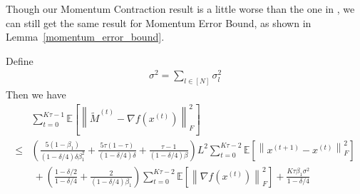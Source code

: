 Though our Momentum Contraction result is a little worse than the one in \cite{he2024subspace}, we can still get the same result for Momentum Error Bound, as shown in Lemma~\ref{momentum_error_bound}.
\begin{lemma}\label{momentum_error_bound}
Define 
\begin{align*}
    \sigma^2 = \sum_{l\in[N]}\sigma_l^2
\end{align*}
Then we have 
\begin{align}\label{eq:momentum_error_bound}
&\sum_{t=0}^{K\tau-1}\mathbb{E}\left [ \left \| \tilde{M}^{(t)}-\nabla f(x^{(t)}) \right \|_F^2  \right ]\\
\leq&\left(\frac{5(1-\beta_1)}{(1-\delta/4)\delta\beta_1^2}+\frac{5\tau(1-\tau)}{(1-\delta/4)\delta}+\frac{\tau-1}{(1-\delta/4)\beta}\right)L^2\sum_{t=0}^{K\tau-2}\mathbb{E}\left [ \left \| x^{(t+1)}- x^{(t)} \right \| _F^2 \right ] \\
&~+\left(\frac{1-\delta/2}{1-\delta/4}+\frac{2}{(1-\delta/4)\beta_1}\right) \sum_{t=0}^{K\tau-2}\mathbb{E}\left [ \left \| \nabla  f(x^{(t)}) \right \|_F^2  \right ] + \frac{K\tau\beta_1\sigma^2}{1-\delta/4}
\end{align}
\end{lemma}
